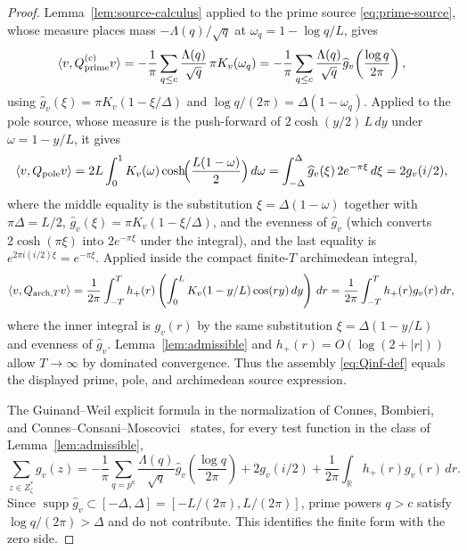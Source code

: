 \documentclass[11pt]{article}
\theoremstyle{plain}
\theoremstyle{definition}
\theoremstyle{remark}
\newcommand{\R}{\mathbb R}
\newcommand{\ccm}{Connes--Consani--Moscovici}
\newcommand{\wh}{\widehat}
\newcommand{\supp}{\operatorname{supp}}
\newcommand{\dd}{\,d}
\begin{document}
\begin{proof}
Lemma~\ref{lem:source-calculus} applied to the prime source
\eqref{eq:prime-source}, whose measure places mass
$-\Lambda(q)/\sqrt q$ at $\omega_q=1-\log q/L$, gives
\[
 \langle v,Q_{\rm prime}^{(c)}v\rangle
 =-\frac1\pi\sum_{q\le c}\frac{\Lambda(q)}{\sqrt q}\,\pi K_v(\omega_q)
 =-\frac1\pi\sum_{q\le c}\frac{\Lambda(q)}{\sqrt q}
   \wh g_v\!\left(\frac{\log q}{2\pi}\right),
\]
using $\wh g_v(\xi)=\pi K_v(1-\xi/\Delta)$ and $\log q/(2\pi)=\Delta(1-\omega_q)$.
Applied to the pole source, whose measure is the push-forward of
$2\cosh(y/2)\,L\dd y$ under $\omega=1-y/L$, it gives
\[
 \langle v,Q_{\rm pole}v\rangle
 =2L\int_0^1 K_v(\omega)\cosh\!\Bigl(\frac{L(1-\omega)}2\Bigr)\dd\omega
 =\int_{-\Delta}^{\Delta}\wh g_v(\xi)\,2e^{-\pi\xi}\dd\xi
 =2g_v(i/2),
\]
where the middle equality is the substitution $\xi=\Delta(1-\omega)$ together
with $\pi\Delta=L/2$, $\wh g_v(\xi)=\pi K_v(1-\xi/\Delta)$, and the evenness
of $\wh g_v$ (which converts $2\cosh(\pi\xi)$ into $2e^{-\pi\xi}$ under the
integral), and the last equality is $e^{2\pi i(i/2)\xi}=e^{-\pi\xi}$.
Applied inside the compact finite-$T$ archimedean integral,
\[
 \langle v,Q_{{\rm arch},T}v\rangle
 =\frac1{2\pi}\int_{-T}^{T}h_+(r)
     \left(\int_0^LK_v(1-y/L)\cos(ry)\dd y\right)\dd r
 =\frac1{2\pi}\int_{-T}^{T}h_+(r)g_v(r)\dd r,
\]
where the inner integral is $g_v(r)$ by the same substitution
$\xi=\Delta(1-y/L)$ and evenness of $\wh g_v$.
Lemma~\ref{lem:admissible} and $h_+(r)=O(\log(2+|r|))$
\cite{DLMFDigammaAsymptotic} allow
$T\to\infty$ by dominated convergence.  Thus the assembly
\eqref{eq:Qinf-def} equals the displayed prime, pole, and archimedean source
expression.

The Guinand--Weil explicit formula in the normalization of Connes, Bombieri,
and \ccm\ \cite{Guinand1948,Weil1952,Connes1999,Bombieri2000,
ConnesConsaniMoscovici2025} states, for every test function in the class of
Lemma~\ref{lem:admissible},
\[
\sum_{z\in Z_\zeta^*}g_v(z)
  =-\frac1\pi\sum_{q=p^a}\frac{\Lambda(q)}{\sqrt q}
        \wh g_v\!\left(\frac{\log q}{2\pi}\right)
     +2g_v(i/2)
      +\frac{1}{2\pi}\int_{\R}h_+(r)g_v(r)\dd r .
\]
Since $\supp\wh g_v\subset[-\Delta,\Delta]=[-L/(2\pi),L/(2\pi)]$, prime powers
$q>c$ satisfy $\log q/(2\pi)>\Delta$ and do not contribute.  This identifies
the finite form with the zero side.
\end{proof}
\end{document}
